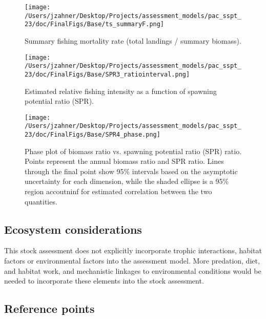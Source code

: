 \documentclass[11pt,
  letterpaper,
]{article}
\begin{document}
\begin{figure}
{\centering
\texttt{[image: /Users/jzahner/Desktop/Projects/assessment\_models/pac\_sspt\_23/doc/FinalFigs/Base/ts\_summaryF.png]}
}
\caption{Summary fishing mortality rate (total landings / summary biomass).\label{fig:summary_fES}}
\end{figure}

\begin{figure}
{\centering
\texttt{[image: /Users/jzahner/Desktop/Projects/assessment\_models/pac\_sspt\_23/doc/FinalFigs/Base/SPR3\_ratiointerval.png]}
}
\caption{Estimated relative fishing intensity as a function of spawning potential ratio (SPR).\label{fig:spr_trajectoryES}}
\end{figure}

\begin{figure}
{\centering
\texttt{[image: /Users/jzahner/Desktop/Projects/assessment\_models/pac\_sspt\_23/doc/FinalFigs/Base/SPR4\_phase.png]}
}
\caption{Phase plot of biomass ratio vs. spawning potential ratio (SPR) ratio. Points represent the annual biomass ratio and SPR ratio. Lines through the final point show 95\% intervals based on the asymptotic uncertainty for each dimension, while the shaded ellipse is a 95\% region accoutninf for estimated correlation between the two quantities.\label{fig:phase_diagramES}}
\end{figure}
\clearpage

\hypertarget{ecosystem-considerations}{%
\subsection*{Ecosystem considerations}\label{ecosystem-considerations}}

This stock assessment does not explicitly incorporate trophic interactions, habitat factors or environmental factors into the assessment model. More predation, diet, and habitat work, and mechanistic linkages to environmental conditions would be needed to incorporate these elements into the stock assessment.

\hypertarget{reference-points}{%
\subsection*{Reference points}\label{reference-points}}
\end{document}

